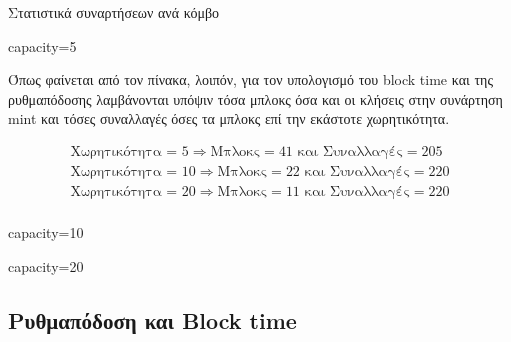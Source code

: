 \documentclass{article}
\newcommand{\eng}[1]{\foreignlanguage{english}{#1}} %
\begin{document}
\begin{table}[ht]
    \caption{Στατιστικά συναρτήσεων ανά κόμβο} 
    \label{tab:throughput-funcs}
    \begin{subtable}{\textwidth}
        \centering
        \caption{\eng{capacity=5}}
        \label{tab:throughput-funcs-1}
    \end{subtable}
\end{table}

Όπως φαίνεται από τον πίνακα, λοιπόν, για τον υπολογισμό του \eng{block time} και
της ρυθμαπόδοσης λαμβάνονται υπόψιν τόσα μπλοκς όσα και οι κλήσεις στην συνάρτηση
\eng{mint} και τόσες συναλλαγές όσες τα μπλοκς επί την εκάστοτε χωρητικότητα.

\begin{equation}
    \begin{gathered}
        \text{Χωρητικότητα = 5} \Rightarrow \text{Μπλοκς} = 41 \text{ και } \text{Συναλλαγές} = 205 \\
        \text{Χωρητικότητα = 10} \Rightarrow \text{Μπλοκς} = 22 \text{ και } \text{Συναλλαγές} = 220 \\
        \text{Χωρητικότητα = 20} \Rightarrow \text{Μπλοκς} = 11 \text{ και } \text{Συναλλαγές} = 220 \\
    \end{gathered}
\end{equation}

\begin{table}[ht]
    \ContinuedFloat
    \begin{subtable}{0.45\textwidth}
        \centering
        \caption{\eng{capacity=10}}
        \label{tab:throughput-funcs-2}
    \end{subtable}
    \hfill
    \begin{subtable}{0.45\textwidth}
        \centering
        \caption{\eng{capacity=20}}
        \label{tab:throughput-funcs-3}
    \end{subtable}
\end{table}
\FloatBarrier

\subsection{Ρυθμαπόδοση και \eng{Block time}}
\end{document}
